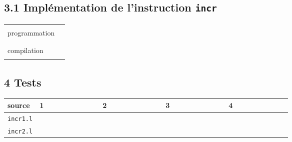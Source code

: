 \documentclass[12pt,a4paper]{article}
\begin{document}
\subsection*{3.1 Implémentation de l'instruction {\tt incr}}

\begin{tabular}{|p{3cm}|p{12cm}|} \hline
& \\
programmation & \\ 
& \\\hline
& \\
compilation & \\ 
& \\\hline
\end{tabular}

\subsection*{4 Tests}

\begin{tabular}{|p{3.4cm}|l|l|l|l|} \hline
source       & 1 & 2 & 3 & 4 \\ \hline
{\tt incr1.l} &~~~~~~~~~~~~~~~~ &~~~~~~~~~~~~~~~~      &~~~~~~~~~~~~~~~~  &~~~~~~~~~~~~~~~~         \\ \hline
{\tt incr2.l} &~~~~~~~~~~~~~~~~ &~~~~~~~~~~~~~~~~      &~~~~~~~~~~~~~~~~  &~~~~~~~~~~~~~~~~         \\ \hline
\end{tabular}
\end{document}
